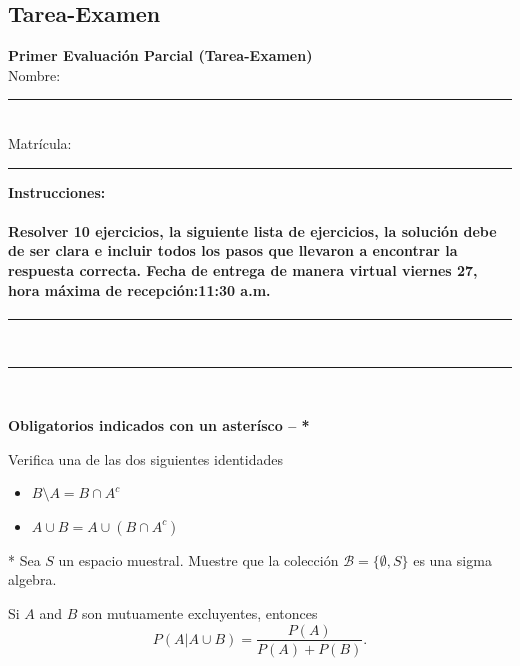 \subsection{Tarea-Examen}
\newpage

\begin{center}
    {\Large \textbf{Primer Evaluaci\'on Parcial (Tarea-Examen)}} \\[0.3cm]
    Nombre: \rule{10cm}{0.4pt} \\[0.3cm]
    Matrícula: \rule{5cm}{0.4pt}
\end{center}


\textbf{Instrucciones:}

\paragraph{
Resolver 10 ejercicios,  la siguiente lista de ejercicios, la soluci\'on debe de ser clara e incluir todos los pasos que llevaron a encontrar la respuesta correcta. Fecha de entrega de manera virtual viernes 27, hora m\'axima de recepci\'on:11:30 a.m.}
\begin{center}
\rule{15cm}{0.4pt} \\[0.2cm]
\rule{15cm}{0.4pt} \\[0.2cm]
\end{center}
\textbf{Obligatorios indicados con un aster\'isco -- *}

\begin{Quest} Verifica una de las dos siguientes identidades

\begin{itemize}
\item[(c)] $B \setminus A = B \cap A^{c}$

\item[(d)] $A \cup B = A \cup (B \cap A^{c})$

\end{itemize}
\end{Quest}

\begin{Quest}* Sea $S$ un espacio muestral. Muestre que la colecci\'on  $\mathcal{B}=\{\emptyset,S\}$ es  una sigma algebra.
\end{Quest}

\begin{Quest} Si $A$ and $B$ son mutuamente excluyentes, entonces \[P(A|A \cup B)=\frac{P(A)}{P(A)+P(B)}.\]
\end{Quest}

